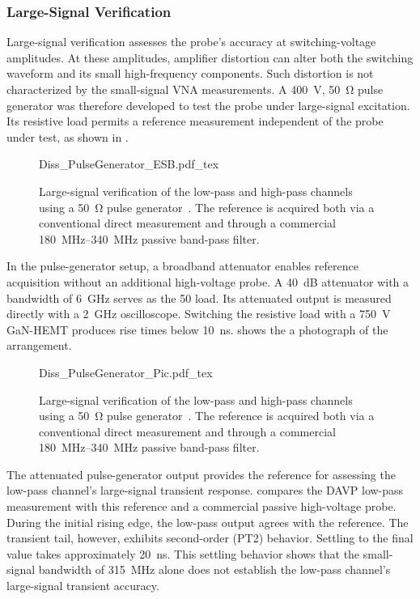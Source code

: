 \subsubsection*{Large-Signal Verification}
Large-signal verification assesses the probe's accuracy at switching-voltage amplitudes.
At these amplitudes, amplifier distortion can alter both the switching waveform and its small high-frequency components.
Such distortion is not characterized by the small-signal VNA measurements.
A \SI{400}{V}, \SI{50}{\ohm} pulse generator was therefore developed to test the probe under large-signal excitation.
Its resistive load permits a reference measurement independent of the probe under test, as shown in .

\begin{figure}[ht]
	\centering
	{Diss_PulseGenerator_ESB.pdf_tex}
	\caption{Large-signal verification of the low-pass and high-pass channels using a \SI{50}{\ohm} pulse generator~\cite{kragl_active_2025}. The reference is acquired both via a conventional direct measurement and through a commercial \SI{180}{MHz}--\SI{340}{MHz} passive band-pass filter.}\label{fig:MS_PulsGen_ESB}
\end{figure}

In the pulse-generator setup, a broadband attenuator enables reference acquisition without an additional high-voltage probe.
A \SI{40}{dB} attenuator with a bandwidth of \SI{6}{GHz} serves as the \SI{50}{\Omega} load.
Its attenuated output is measured directly with a \SI{2}{GHz} oscilloscope.
Switching the resistive load with a \SI{750}{V} GaN-HEMT produces rise times below \SI{10}{ns}.
 shows the a photograph of the arrangement.

\begin{figure}[ht]
	\centering
	{Diss_PulseGenerator_Pic.pdf_tex}
	\caption{Large-signal verification of the low-pass and high-pass channels using a \SI{50}{\ohm} pulse generator~\cite{kragl_active_2025}. The reference is acquired both via a conventional direct measurement and through a commercial \SI{180}{MHz}--\SI{340}{MHz} passive band-pass filter.}\label{fig:MS_PulsGen_Pic}
\end{figure}

The attenuated pulse-generator output provides the reference for assessing the low-pass channel's large-signal transient response.
 compares the DAVP low-pass measurement with this reference and a commercial passive high-voltage probe.
During the initial rising edge, the low-pass output agrees with the reference.
The transient tail, however, exhibits second-order (PT2) behavior.
Settling to the final value takes approximately \SI{20}{ns}.
This settling behavior shows that the small-signal bandwidth of \SI{315}{MHz} alone does not establish the low-pass channel's large-signal transient accuracy.

